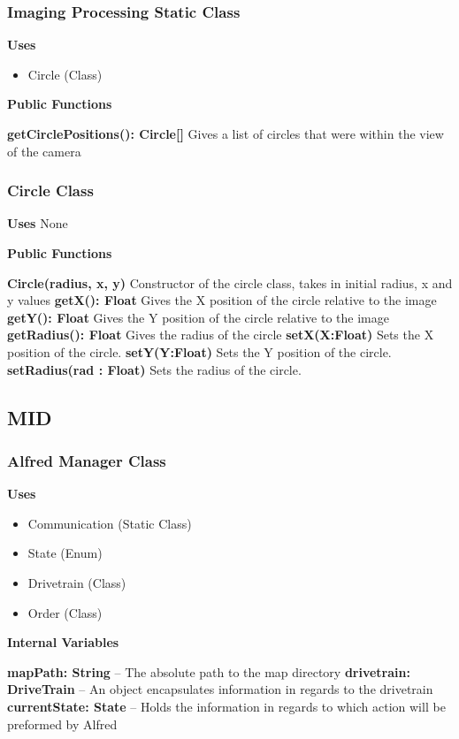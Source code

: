 \documentclass [10pt]{article}
\begin{document}
\subsubsection{Imaging Processing Static Class}
\textbf{Uses}
\begin{itemize}
	\item Circle (Class)
\end{itemize}

\textbf{Public Functions}

\textbf{getCirclePositions(): Circle[]}
Gives a list of circles that were within the view of the camera

\subsubsection{Circle Class}

\textbf{Uses}
None

\textbf{Public Functions}

\textbf{Circle(radius, x, y)}
Constructor of the circle class, takes in initial radius, x and y values
\textbf{getX(): Float}
Gives the X position of the circle relative to the image
\textbf{getY(): Float}
Gives the Y position of the circle relative to the image
\textbf{getRadius(): Float}
Gives the radius of the circle
\textbf{setX(X:Float)}
Sets the X position of the circle.
\textbf{setY(Y:Float)}
Sets the Y position of the circle.
\textbf{setRadius(rad : Float)}
Sets the radius of the circle.

\subsection{MID}

\subsubsection{Alfred Manager Class}

\textbf{Uses}
\begin{itemize}
	\item Communication (Static Class)
	\item State (Enum)
	\item Drivetrain (Class)
	\item Order (Class)
\end{itemize}


\textbf{Internal Variables}

\textbf{mapPath: String} – The absolute path to the map directory
\textbf{drivetrain: DriveTrain} – An object encapsulates information in regards to the drivetrain
\textbf{currentState: State} – Holds the information in regards to which action will be preformed by Alfred
\end{document}
